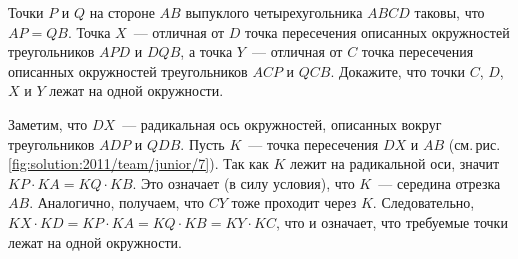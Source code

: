 \problem
{}
Точки $P$ и $Q$ на стороне $AB$ выпуклого четырехугольника $ABCD$ таковы, что
$AP = QB$.
Точка $X$~--- отличная от $D$ точка пересечения описанных окружностей
треугольников $APD$ и $DQB$, а точка $Y$~--- отличная от $C$ точка пересечения
описанных окружностей треугольников $ACP$ и $QCB$.
Докажите, что точки $C$, $D$, $X$ и $Y$ лежат на одной окружности.

%
\label{solution:2011/team/junior/7}%
Заметим, что $DX$~--- радикальная ось окружностей, описанных вокруг
треугольников $ADP$ и $QDB$.
Пусть $K$~--- точка пересечения $DX$ и $AB$
(см.\,рис.\,\ref{fig:solution:2011/team/junior/7}).
Так как $K$ лежит на радикальной оси, значит $KP \cdot KA = KQ \cdot KB$.
Это означает (в силу условия), что $K$~--- середина отрезка $AB$.
Аналогично, получаем, что $CY$ тоже проходит через $K$.
Следовательно, $KX \cdot KD = KP \cdot KA = KQ \cdot KB = KY \cdot KC$, что и
означает, что требуемые точки лежат на одной окружности.

\endproblem
